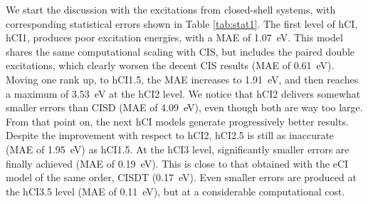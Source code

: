 \documentclass[aip,jcp,reprint,noshowkeys,superscriptaddress]{revtex4-1}
\begin{document}
We start the discussion with the excitations from closed-shell systems, with corresponding statistical errors shown in Table \ref{tab:stat1}.
The first level of hCI, hCI1, produces poor excitation energies, with a MAE of \SI{1.07}{\eV}.
This model shares the same computational scaling with CIS, but includes the paired double excitations,
which clearly worsen the decent CIS results (MAE of \SI{0.61}{\eV}).
Moving one rank up, to hCI1.5, the MAE increases to \SI{1.91}{\eV}, and then reaches a maximum of \SI{3.53}{\eV} at the hCI2 level.
We notice that hCI2 delivers somewhat smaller errors than CISD (MAE of \SI{4.09}{\eV}), even though both are way too large.
From that point on, the next hCI models generate progressively better results.
Despite the improvement with respect to hCI2, hCI2.5 is still as inaccurate (MAE of \SI{1.95}{\eV}) as hCI1.5.
At the hCI3 level, significantly smaller errors are finally achieved (MAE of \SI{0.19}{\eV}).
This is close to that obtained with the eCI model of the same order, CISDT (\SI{0.17}{\eV}).
Even smaller errors are produced at the hCI3.5 level (MAE of \SI{0.11}{\eV}), but at a considerable computational cost.

\end{document}
